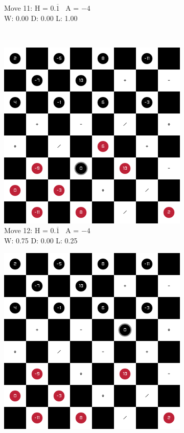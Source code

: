 \begin{figure}[H]
\begin{subfigure}{0.3\textwidth}
        \caption*{Move 11: H = $0.\overline1$ \textbar\ A = $-4$ \\ W: 0.00 D: 0.00 L: 1.00}
    \end{subfigure} \\
    \begin{subfigure}{0.3\textwidth}
        \centering
        \includegraphics[width=\textwidth]{images/games/game2/move_13.png}
        \caption*{Move 12: H = $0.\overline1$ \textbar\ A = $-4$ \\ W: 0.75 D: 0.00 L: 0.25}
    \end{subfigure}
    \quad
    \begin{subfigure}{0.3\textwidth}
        \centering
        \includegraphics[width=\textwidth]{images/games/game2/move_14.png}

\end{subfigure}
\end{figure}
